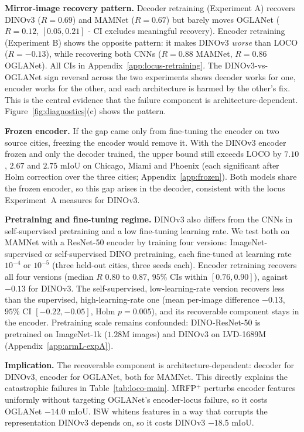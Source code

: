 \textbf{Mirror-image recovery pattern.} Decoder retraining (Experiment A) recovers DINOv3 ($R = 0.69$) and MAMNet ($R = 0.67$) but barely moves OGLANet ($R = 0.12$, $[0.05, 0.21]$ - CI excludes meaningful recovery). Encoder retraining (Experiment B) shows the opposite pattern: it makes DINOv3 \textit{worse} than LOCO ($R = -0.13$), while recovering both CNNs ($R = 0.88$ MAMNet, $R = 0.86$ OGLANet). All CIs in Appendix~\ref{app:locus-retraining}. The DINOv3-vs-OGLANet sign reversal across the two experiments shows decoder works for one, encoder works for the other, and each architecture is harmed by the other's fix. This is the central evidence that the failure component is architecture-dependent. Figure~\ref{fig:diagnostics}(c) shows the pattern.

\textbf{Frozen encoder.} If the gap came only from fine-tuning the encoder on two source cities, freezing the encoder would remove it. With the DINOv3 encoder frozen and only the decoder trained, the upper bound still exceeds LOCO by $7.10$, $2.67$ and $2.75$ mIoU on Chicago, Miami and Phoenix (each significant after Holm correction over the three cities; Appendix~\ref{app:frozen}). Both models share the frozen encoder, so this gap arises in the decoder, consistent with the locus Experiment~A measures for DINOv3.

\textbf{Pretraining and fine-tuning regime.} DINOv3 also differs from the CNNs in self-supervised pretraining and a low fine-tuning learning rate. We test both on MAMNet with a ResNet-50 encoder by training four versions: ImageNet-supervised or self-supervised DINO pretraining, each fine-tuned at learning rate $10^{-4}$ or $10^{-5}$ (three held-out cities, three seeds each). Encoder retraining recovers all four versions (median $R$ $0.80$ to $0.87$, $95\%$ CIs within $[0.76, 0.90]$), against $-0.13$ for DINOv3. The self-supervised, low-learning-rate version recovers less than the supervised, high-learning-rate one (mean per-image difference $-0.13$, $95\%$ CI $[-0.22, -0.05]$, Holm $p = 0.005$), and its recoverable component stays in the encoder. Pretraining scale remains confounded: DINO-ResNet-50 is pretrained on ImageNet-1k ($1.28$M images) and DINOv3 on LVD-1689M (Appendix~\ref{app:armL-expA}).

\textbf{Implication.} The recoverable component is architecture-dependent: decoder for DINOv3, encoder for OGLANet, both for MAMNet. This directly explains the catastrophic failures in Table~\ref{tab:loco-main}. MRFP$^+$ perturbs encoder features uniformly without targeting OGLANet's encoder-locus failure, so it costs OGLANet $-14.0$ mIoU. ISW whitens features in a way that corrupts the representation DINOv3 depends on, so it costs DINOv3 $-18.5$ mIoU.

